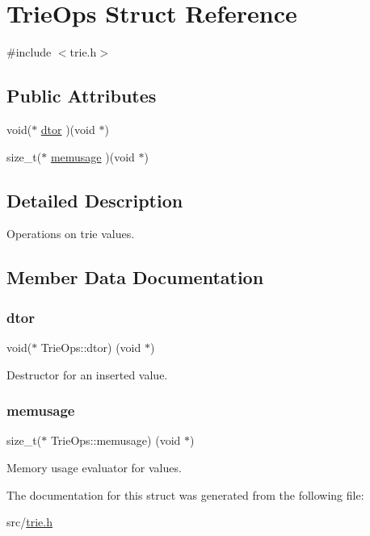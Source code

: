 \hypertarget{structTrieOps}{}\section{Trie\+Ops Struct Reference}
\label{structTrieOps}


{\ttfamily \#include $<$trie.\+h$>$}

\subsection*{Public Attributes}
\begin{DoxyCompactItemize}
\item 
void($\ast$ \mbox{\hyperlink{structTrieOps_ac0568b096d582ac3deda05509e85ff10}{dtor}} )(void $\ast$)
\item 
size\+\_\+t($\ast$ \mbox{\hyperlink{structTrieOps_a26ddce48bc5999f3354224f3c707f612}{memusage}} )(void $\ast$)
\end{DoxyCompactItemize}


\subsection{Detailed Description}
Operations on trie values. 

\subsection{Member Data Documentation}
\mbox{\label{structTrieOps_ac0568b096d582ac3deda05509e85ff10}} 
\subsubsection{\texorpdfstring{dtor}{dtor}}
{\footnotesize\ttfamily void($\ast$ Trie\+Ops\+::dtor) (void $\ast$)}

Destructor for an inserted value. \mbox{\label{structTrieOps_a26ddce48bc5999f3354224f3c707f612}} 
\subsubsection{\texorpdfstring{memusage}{memusage}}
{\footnotesize\ttfamily size\+\_\+t($\ast$ Trie\+Ops\+::memusage) (void $\ast$)}

Memory usage evaluator for values. 

The documentation for this struct was generated from the following file\+:\begin{DoxyCompactItemize}
\item 
src/\mbox{\hyperlink{trie_8h}{trie.\+h}}\end{DoxyCompactItemize}
